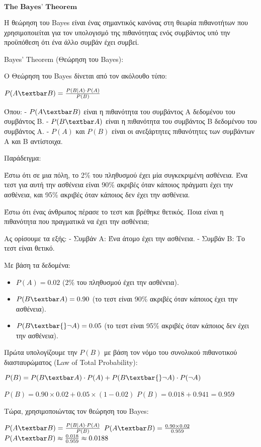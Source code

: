 \documentclass[11pt]{article}
\providecommand{\tightlist}{%
      \setlength{\itemsep}{0pt}\setlength{\parskip}{0pt}}
\begin{document}
    \(\textbf{The Bayes’ Theorem}\)

    Η θεώρηση του Bayes είναι ένας σημαντικός κανόνας στη θεωρία πιθανοτήτων
που χρησιμοποιείται για τον υπολογισμό της πιθανότητας ενός συμβάντος
υπό την προϋπόθεση ότι ένα άλλο συμβάν έχει συμβεί.

Bayes' Theorem (Θεώρηση του Bayes):

Ο Θεώρηση του Bayes δίνεται από τον ακόλουθο τύπο:

$ P(A\textbar B) = \frac{P(B|A) \cdot P(A)}{P(B)} $

Όπου: - $ P(A\textbar B) $ είναι η πιθανότητα του συμβάντος A
δεδομένου του συμβάντος B. - $ P(B\textbar A) $ είναι η πιθανότητα του
συμβάντος B δεδομένου του συμβάντος A. - $ P(A) $ και $ P(B) $ είναι
οι ανεξάρτητες πιθανότητες των συμβάντων A και B αντίστοιχα.

Παράδειγμα:

Έστω ότι σε μια πόλη, το 2\% του πληθυσμού έχει μία συγκεκριμένη
ασθένεια. Ένα τεστ για αυτή την ασθένεια είναι 90\% ακριβές όταν κάποιος
πράγματι έχει την ασθένεια, και 95\% ακριβές όταν κάποιος δεν έχει την
ασθένεια.

Έστω ότι ένας άνθρωπος πέρασε το τεστ και βρέθηκε θετικός. Ποια είναι η
πιθανότητα που πραγματικά να έχει την ασθένεια;

Ας ορίσουμε τα εξής: - Συμβάν A: Ένα άτομο έχει την ασθένεια. - Συμβάν
B: Το τεστ είναι θετικό.

Με βάση τα δεδομένα:

\begin{itemize}
\tightlist
\item
  $ P(A) = 0.02 $ (2\% του πληθυσμού έχει την ασθένεια).
\item
  $ P(B\textbar A) = 0.90 $ (το τεστ είναι 90\% ακριβές όταν κάποιος
  έχει την ασθένεια).
\item
  $ P(B\textbar{}\neg A) = 0.05 $ (το τεστ είναι 95\% ακριβές όταν
  κάποιος δεν έχει την ασθένεια).
\end{itemize}

Πρώτα υπολογίζουμε την $ P(B) $ με βάση τον νόμο του συνολικού
πιθανοτικού διασταυρώματος (Law of Total Probability):

$ P(B) = P(B\textbar A) \cdot P(A) + P(B\textbar{}\neg A)
\cdot P(\neg A) $

$ P(B) = 0.90 \times 0.02 + 0.05 \times (1-0.02) $ $ P(B) = 0.018 +
0.941 = 0.959 $

Τώρα, χρησιμοποιώντας τον θεώρηση του Bayes:

$ P(A\textbar B) = \frac{P(B|A) \cdot P(A)}{P(B)} $ 
$ P(A\textbar B)= \frac{0.90 \times 0.02}{0.959} $ 
$ P(A\textbar B) \approx \frac{0.018}{0.959} \approx 0.0188 $
\end{document}
